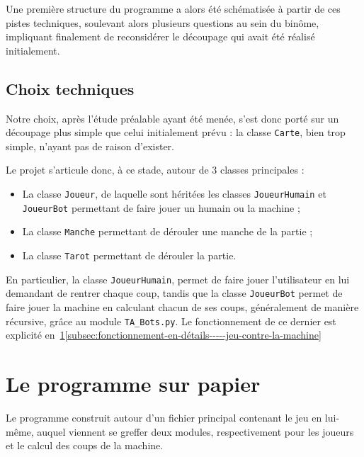       Une première structure du programme a alors été schématisée à partir de ces pistes techniques, soulevant alors plusieurs questions au sein du binôme, impliquant finalement de reconsidérer le découpage qui avait été réalisé initialement.

   \subsection{Choix techniques}\label{subsec:choix-techniques}
      Notre choix, après l'étude préalable ayant été menée, s'est donc porté sur un découpage plus simple que celui initialement prévu : la classe \texttt{Carte}, bien trop simple, n'ayant pas de raison d'exister.

      Le projet s'articule donc, à ce stade, autour de 3 classes principales :
      \begin{itemize}
         \item La classe \texttt{Joueur}, de laquelle sont héritées les classes \texttt{JoueurHumain} et \texttt{JoueurBot} permettant de faire jouer un humain ou la machine ;
         \item La classe \texttt{Manche} permettant de dérouler une manche de la partie ;
         \item La classe \texttt{Tarot} permettant de dérouler la partie.
      \end{itemize}

      En particulier, la classe \texttt{JoueurHumain}, permet de faire jouer l'utilisateur en lui demandant de rentrer chaque coup, tandis que la classe \texttt{JoueurBot} permet de faire jouer la machine en calculant chacun de ses coups, généralement de manière récursive, grâce au module \texttt{TA\_Bots.py}.
      Le fonctionnement de ce dernier est explicité en~\ref{sec:le-programme-sur-papier}\ref{subsec:fonctionnement-en-détails-----jeu-contre-la-machine}


\section{Le programme sur papier}\label{sec:le-programme-sur-papier}
   Le programme construit autour d'un fichier principal contenant le jeu en lui-même, auquel viennent se greffer deux modules, respectivement pour les joueurs et le calcul des coups de la machine.

